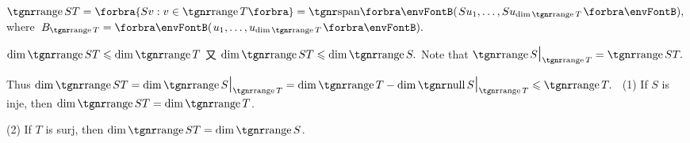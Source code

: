 \par\quad
$\range ST=\Bra{Sv:v\in\range T}=\Span{Su_1,\dots,Su_{\dim\range T}},$ where \,$B_{\range T}=\Par{u_1,\dots,u_{\dim\range T}}.$\par\quad
$\dim\range ST\leqslant \dim\range T$
又 $\dim\range ST\leqslant \dim\range S.$\PfEnd\vspace{4pt}\quad
\Or Note that $\range S\mmid_{\range T}=\range ST.$\par\quad
Thus $\dim\range ST=\dim\range S\mmid_{\range T}=\dim\range T-\dim\null S\mmid_{\range T}\leqslant \range T.$\vspace{4pt}\PfEnd
\Corollary \,\,\,(1) If $S$ is inje, then $\dim\range ST=\dim\range T$.\par\Blind{\Corollary \,\,}
(2) If $T$ is surj, then $\dim\range ST=\dim\range S$.
\SepLine

